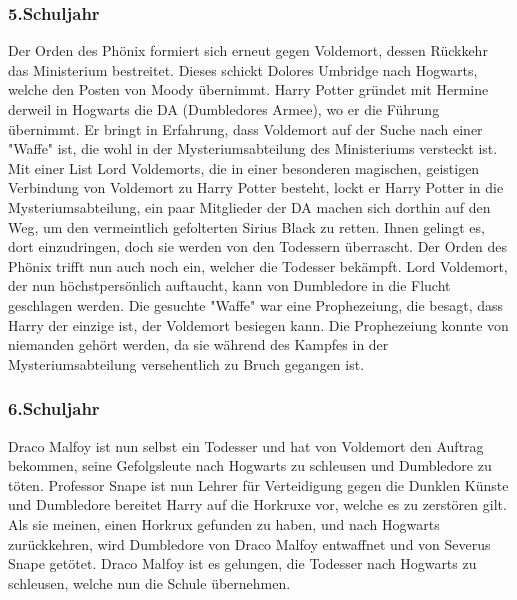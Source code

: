 \documentclass[a4paper, 10pt]{article}
\begin{document}
\subsubsection*{\large 5.Schuljahr}
Der Orden des Phönix formiert sich erneut gegen Voldemort, dessen Rückkehr das Ministerium bestreitet. Dieses schickt Dolores Umbridge nach Hogwarts, welche den Posten von Moody übernimmt.
\vspace{10pt}
\newline
{}  
Harry Potter gründet mit Hermine derweil in Hogwarts die DA (Dumbledores Armee), wo er die Führung übernimmt. Er bringt in Erfahrung, dass Voldemort auf der Suche nach einer "Waffe" ist, die wohl in der Mysteriumsabteilung des Ministeriums versteckt ist.
\vspace{10pt}
\newline
{}  
Mit einer List Lord Voldemorts, die in einer besonderen magischen, geistigen Verbindung von Voldemort zu Harry Potter besteht, lockt er Harry Potter in die Mysteriumsabteilung, ein paar Mitglieder der DA machen sich dorthin auf den Weg, um den vermeintlich gefolterten Sirius Black zu retten. Ihnen gelingt es, dort einzudringen, doch sie werden von den Todessern überrascht. Der Orden des Phönix trifft nun auch noch ein, welcher die Todesser bekämpft. Lord Voldemort, der nun höchstpersönlich auftaucht, kann von Dumbledore in die Flucht geschlagen werden.
\vspace{10pt}
\newline
{}  
Die gesuchte "Waffe" war eine Prophezeiung, die besagt, dass Harry der einzige ist, der Voldemort besiegen kann. Die Prophezeiung konnte von niemanden gehört werden, da sie während des Kampfes in der Mysteriumsabteilung versehentlich zu Bruch gegangen ist.
\subsubsection*{\large 6.Schuljahr}
Draco Malfoy ist nun selbst ein Todesser und hat von Voldemort den Auftrag bekommen, seine Gefolgsleute nach Hogwarts zu schleusen und Dumbledore zu töten.
\vspace{10pt}
\newline
{}  
Professor Snape ist nun Lehrer für Verteidigung gegen die Dunklen Künste und Dumbledore bereitet Harry auf die Horkruxe vor, welche es zu zerstören gilt. Als sie meinen, einen Horkrux gefunden zu haben, und nach Hogwarts zurückkehren, wird Dumbledore von Draco Malfoy entwaffnet und von Severus Snape getötet.
\vspace{10pt}
\newline
{}  
Draco Malfoy ist es gelungen, die Todesser nach Hogwarts zu schleusen, welche nun die Schule übernehmen.
\end{document}
